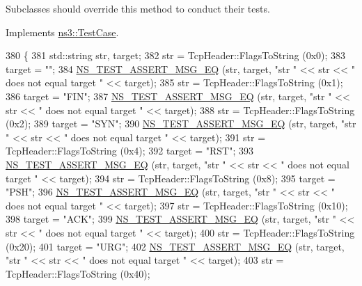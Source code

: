 Subclasses should override this method to conduct their tests. 

Implements \hyperlink{classns3_1_1TestCase_a8ff74680cf017ed42011e4be51917a24}{ns3\+::\+Test\+Case}.


\begin{DoxyCode}
380 \{
381   std::string str, target;
382   str = TcpHeader::FlagsToString (0x0);
383   target = \textcolor{stringliteral}{""};
384   \hyperlink{group__testing_ga2a9d78cffb3db8e867c35fff0b698cf5}{NS\_TEST\_ASSERT\_MSG\_EQ} (str, target, \textcolor{stringliteral}{"str "} << str <<  \textcolor{stringliteral}{" does not equal target "} << 
      target);
385   str = TcpHeader::FlagsToString (0x1);
386   target = \textcolor{stringliteral}{"FIN"};
387   \hyperlink{group__testing_ga2a9d78cffb3db8e867c35fff0b698cf5}{NS\_TEST\_ASSERT\_MSG\_EQ} (str, target, \textcolor{stringliteral}{"str "} << str <<  \textcolor{stringliteral}{" does not equal target "} << 
      target);
388   str = TcpHeader::FlagsToString (0x2);
389   target = \textcolor{stringliteral}{"SYN"};
390   \hyperlink{group__testing_ga2a9d78cffb3db8e867c35fff0b698cf5}{NS\_TEST\_ASSERT\_MSG\_EQ} (str, target, \textcolor{stringliteral}{"str "} << str <<  \textcolor{stringliteral}{" does not equal target "} << 
      target);
391   str = TcpHeader::FlagsToString (0x4);
392   target = \textcolor{stringliteral}{"RST"};
393   \hyperlink{group__testing_ga2a9d78cffb3db8e867c35fff0b698cf5}{NS\_TEST\_ASSERT\_MSG\_EQ} (str, target, \textcolor{stringliteral}{"str "} << str <<  \textcolor{stringliteral}{" does not equal target "} << 
      target);
394   str = TcpHeader::FlagsToString (0x8);
395   target = \textcolor{stringliteral}{"PSH"};
396   \hyperlink{group__testing_ga2a9d78cffb3db8e867c35fff0b698cf5}{NS\_TEST\_ASSERT\_MSG\_EQ} (str, target, \textcolor{stringliteral}{"str "} << str <<  \textcolor{stringliteral}{" does not equal target "} << 
      target);
397   str = TcpHeader::FlagsToString (0x10);
398   target = \textcolor{stringliteral}{"ACK"};
399   \hyperlink{group__testing_ga2a9d78cffb3db8e867c35fff0b698cf5}{NS\_TEST\_ASSERT\_MSG\_EQ} (str, target, \textcolor{stringliteral}{"str "} << str <<  \textcolor{stringliteral}{" does not equal target "} << 
      target);
400   str = TcpHeader::FlagsToString (0x20);
401   target = \textcolor{stringliteral}{"URG"};
402   \hyperlink{group__testing_ga2a9d78cffb3db8e867c35fff0b698cf5}{NS\_TEST\_ASSERT\_MSG\_EQ} (str, target, \textcolor{stringliteral}{"str "} << str <<  \textcolor{stringliteral}{" does not equal target "} << 
      target);
403   str = TcpHeader::FlagsToString (0x40);

\end{DoxyCode}
